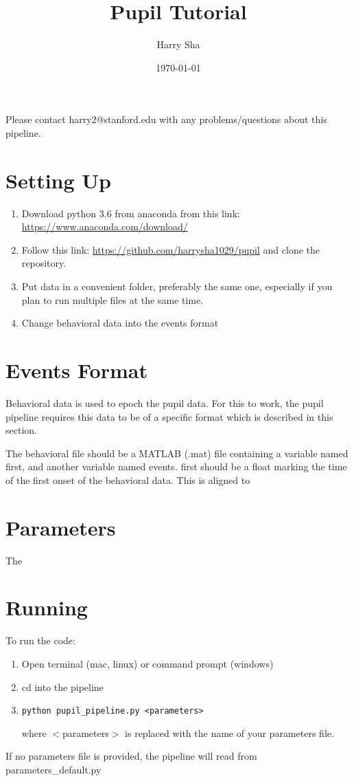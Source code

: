 \documentclass{article}
\title{\textcolor{sectioncolor}{Pupil Tutorial}}
\author{Harry Sha}
\date{\today}
\begin{document}
\clearpage\maketitle
Please contact harry2@stanford.edu with any problems/questions about this pipeline.
\tableofcontents
\thispagestyle{empty}

\sectionfont{\color{sectioncolor}}
\subsectionfont{\color{subsectioncolor}}

\section{Setting Up}
\begin{enumerate}
\item Download python 3.6 from anaconda from this link: \href{https://www.anaconda.com/download/}{https://www.anaconda.com/download/}
\item Follow this link: \href{https://github.com/harrysha1029/pupil}{https://github.com/harrysha1029/pupil} and clone the repository.
\item Put data in a convenient folder, preferably the same one, especially if you plan to run multiple files at the same time.
\item Change behavioral data into the events format
\end{enumerate}

\section{Events Format}
Behavioral data is used to epoch the pupil data. For this to work, the pupil pipeline requires this data to be of a specific format which is described in this section.

The behavioral file should be a MATLAB (.mat) file containing a variable named first, and another variable named events. first should be a float marking the time of the first onset of the behavioral data. This is aligned to



\section{Parameters}
The


\section{Running}
To run the code:
\begin{enumerate}
\item Open terminal (mac, linux) or command prompt (windows)
\item cd into the pipeline
\item \begin{lstlisting}
python pupil_pipeline.py <parameters>
\end{lstlisting}
where $<$parameters$>$ is replaced with the name of your parameters file.
\end{enumerate}If no parameters file is provided, the pipeline will read from parameters\_default.py
\end{document}
